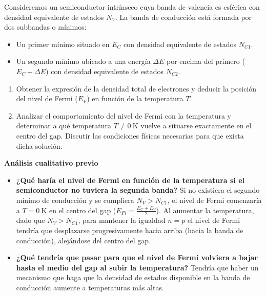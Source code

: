 \newpage
\begin{problema}
Consideremos un semiconductor intrínseco cuya banda de valencia es esférica con densidad equivalente de estados $N_V$. La banda de conducción está formada por dos subbandas o mínimos:
\begin{itemize}
    \item Un primer mínimo situado en $E_C$ con densidad equivalente de estados $N_{C1}$.
    \item Un segundo mínimo ubicado a una energía $\Delta E$ por encima del primero ($E_C + \Delta E$) con densidad equivalente de estados $N_{C2}$.
\end{itemize}

\begin{enumerate}[label=\alph*)]
    \item Obtener la expresión de la densidad total de electrones y deducir la posición del nivel de Fermi ($E_F$) en función de la temperatura $T$.
    \item Analizar el comportamiento del nivel de Fermi con la temperatura y determinar a qué temperatura $T \neq \SI{0}{\kelvin}$ vuelve a situarse exactamente en el centro del gap. Discutir las condiciones físicas necesarias para que exista dicha solución.
\end{enumerate}

\tcblower

\textbf{Análisis cualitativo previo}

\begin{itemize}
    \item \textbf{¿Qué haría el nivel de Fermi en función de la temperatura si el semiconductor no tuviera la segunda banda?}
    Si no existiera el segundo mínimo de conducción y se cumpliera $N_V > N_{C1}$, el nivel de Fermi comenzaría a $T = \SI{0}{\kelvin}$ en el centro del gap ($E_{Fi} = \frac{E_C + E_V}{2}$). Al aumentar la temperatura, dado que $N_V > N_{C1}$, para mantener la igualdad $n = p$ el nivel de Fermi tendría que desplazarse progresivamente hacia arriba (hacia la banda de conducción), alejándose del centro del gap.
    
    \item \textbf{¿Qué tendría que pasar para que el nivel de Fermi volviera a bajar hasta el medio del gap al subir la temperatura?}
    Tendría que haber un mecanismo que haga que la densidad de estados disponible en la banda de conducción aumente a temperaturas más altas.
    

\end{itemize}
\end{problema}
